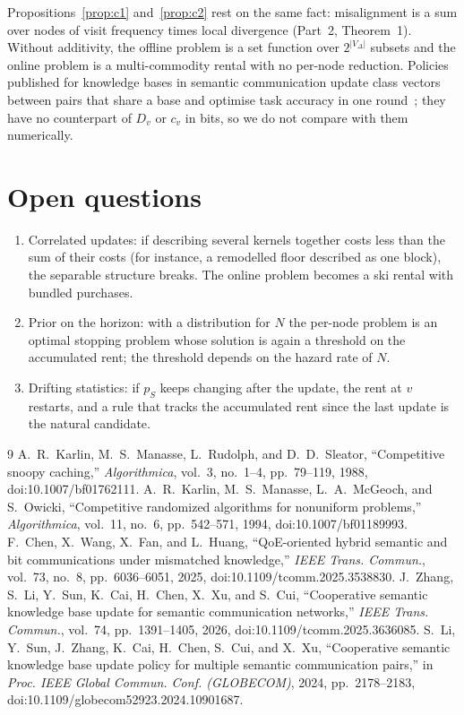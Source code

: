 \documentclass[11pt]{article}
\theoremstyle{definition}
\theoremstyle{remark}
\begin{document}
Propositions~\ref{prop:c1} and~\ref{prop:c2} rest on the same fact: misalignment is a sum over nodes of visit frequency times local divergence (Part~2, Theorem~1). Without additivity, the offline problem is a set function over $2^{|V_\Delta|}$ subsets and the online problem is a multi-commodity rental with no per-node reduction. Policies published for knowledge bases in semantic communication update class vectors between pairs that share a base and optimise task accuracy in one round~\cite{zhang2026kb,li2024}; they have no counterpart of $D_v$ or $c_v$ in bits, so we do not compare with them numerically.

\section{Open questions}
\begin{enumerate}
\item Correlated updates: if describing several kernels together costs less than the sum of their costs (for instance, a remodelled floor described as one block), the separable structure breaks. The online problem becomes a ski rental with bundled purchases.
\item Prior on the horizon: with a distribution for $N$ the per-node problem is an optimal stopping problem whose solution is again a threshold on the accumulated rent; the threshold depends on the hazard rate of $N$.
\item Drifting statistics: if $p_S$ keeps changing after the update, the rent at $v$ restarts, and a rule that tracks the accumulated rent since the last update is the natural candidate.
\end{enumerate}

\begin{thebibliography}{9}
 A.~R.~Karlin, M.~S.~Manasse, L.~Rudolph, and D.~D.~Sleator, ``Competitive snoopy caching,'' \emph{Algorithmica}, vol.~3, no.~1--4, pp.~79--119, 1988, doi:10.1007/bf01762111.
 A.~R.~Karlin, M.~S.~Manasse, L.~A.~McGeoch, and S.~Owicki, ``Competitive randomized algorithms for nonuniform problems,'' \emph{Algorithmica}, vol.~11, no.~6, pp.~542--571, 1994, doi:10.1007/bf01189993.
 F.~Chen, X.~Wang, X.~Fan, and L.~Huang, ``QoE-oriented hybrid semantic and bit communications under mismatched knowledge,'' \emph{IEEE Trans. Commun.}, vol.~73, no.~8, pp.~6036--6051, 2025, doi:10.1109/tcomm.2025.3538830.
 J.~Zhang, S.~Li, Y.~Sun, K.~Cai, H.~Chen, X.~Xu, and S.~Cui, ``Cooperative semantic knowledge base update for semantic communication networks,'' \emph{IEEE Trans. Commun.}, vol.~74, pp.~1391--1405, 2026, doi:10.1109/tcomm.2025.3636085.
 S.~Li, Y.~Sun, J.~Zhang, K.~Cai, H.~Chen, S.~Cui, and X.~Xu, ``Cooperative semantic knowledge base update policy for multiple semantic communication pairs,'' in \emph{Proc. IEEE Global Commun. Conf. (GLOBECOM)}, 2024, pp.~2178--2183, doi:10.1109/globecom52923.2024.10901687.
\end{thebibliography}
\end{document}
